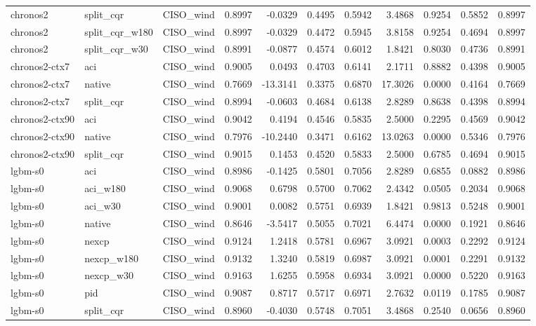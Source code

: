 \begin{tabular}{lllrrrrrrrr}
chronos2 & split_cqr & CISO_wind & 0.8997 & -0.0329 & 0.4495 & 0.5942 & 3.4868 & 0.9254 & 0.5852 & 0.8997 \\
chronos2 & split_cqr_w180 & CISO_wind & 0.8997 & -0.0329 & 0.4472 & 0.5945 & 3.8158 & 0.9254 & 0.4694 & 0.8997 \\
chronos2 & split_cqr_w30 & CISO_wind & 0.8991 & -0.0877 & 0.4574 & 0.6012 & 1.8421 & 0.8030 & 0.4736 & 0.8991 \\
chronos2-ctx7 & aci & CISO_wind & 0.9005 & 0.0493 & 0.4703 & 0.6141 & 2.1711 & 0.8882 & 0.4398 & 0.9005 \\
chronos2-ctx7 & native & CISO_wind & 0.7669 & -13.3141 & 0.3375 & 0.6870 & 17.3026 & 0.0000 & 0.4164 & 0.7669 \\
chronos2-ctx7 & split_cqr & CISO_wind & 0.8994 & -0.0603 & 0.4684 & 0.6138 & 2.8289 & 0.8638 & 0.4398 & 0.8994 \\
chronos2-ctx90 & aci & CISO_wind & 0.9042 & 0.4194 & 0.4546 & 0.5835 & 2.5000 & 0.2295 & 0.4569 & 0.9042 \\
chronos2-ctx90 & native & CISO_wind & 0.7976 & -10.2440 & 0.3471 & 0.6162 & 13.0263 & 0.0000 & 0.5346 & 0.7976 \\
chronos2-ctx90 & split_cqr & CISO_wind & 0.9015 & 0.1453 & 0.4520 & 0.5833 & 2.5000 & 0.6785 & 0.4694 & 0.9015 \\
lgbm-s0 & aci & CISO_wind & 0.8986 & -0.1425 & 0.5801 & 0.7056 & 2.8289 & 0.6855 & 0.0882 & 0.8986 \\
lgbm-s0 & aci_w180 & CISO_wind & 0.9068 & 0.6798 & 0.5700 & 0.7062 & 2.4342 & 0.0505 & 0.2034 & 0.9068 \\
lgbm-s0 & aci_w30 & CISO_wind & 0.9001 & 0.0082 & 0.5751 & 0.6939 & 1.8421 & 0.9813 & 0.5248 & 0.9001 \\
lgbm-s0 & native & CISO_wind & 0.8646 & -3.5417 & 0.5055 & 0.7021 & 6.4474 & 0.0000 & 0.1921 & 0.8646 \\
lgbm-s0 & nexcp & CISO_wind & 0.9124 & 1.2418 & 0.5781 & 0.6967 & 3.0921 & 0.0003 & 0.2292 & 0.9124 \\
lgbm-s0 & nexcp_w180 & CISO_wind & 0.9132 & 1.3240 & 0.5819 & 0.6987 & 3.0921 & 0.0001 & 0.2291 & 0.9132 \\
lgbm-s0 & nexcp_w30 & CISO_wind & 0.9163 & 1.6255 & 0.5958 & 0.6934 & 3.0921 & 0.0000 & 0.5220 & 0.9163 \\
lgbm-s0 & pid & CISO_wind & 0.9087 & 0.8717 & 0.5717 & 0.6971 & 2.7632 & 0.0119 & 0.1785 & 0.9087 \\
lgbm-s0 & split_cqr & CISO_wind & 0.8960 & -0.4030 & 0.5748 & 0.7051 & 3.4868 & 0.2540 & 0.0656 & 0.8960 \\

\end{tabular}
